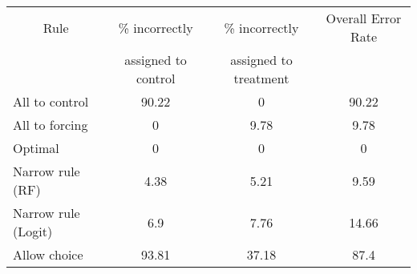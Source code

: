 \begin{tabular}{lccc}
\toprule
\multicolumn{1}{c}{Rule} & \% incorrectly  & \% incorrectly  & Overall Error Rate \\
      & assigned to control  &  assigned to treatment &  \\
\midrule
\midrule
All to control & 90.22 & 0     & 90.22 \\
All to forcing & 0     & 9.78  & 9.78 \\
Optimal & 0     & 0     & 0 \\
Narrow rule (RF) & 4.38  & 5.21  & 9.59 \\
Narrow rule (Logit) & 6.9   & 7.76  & 14.66 \\
Allow choice & 93.81 & 37.18 & 87.4 \\
\bottomrule
\bottomrule
\end{tabular}%
